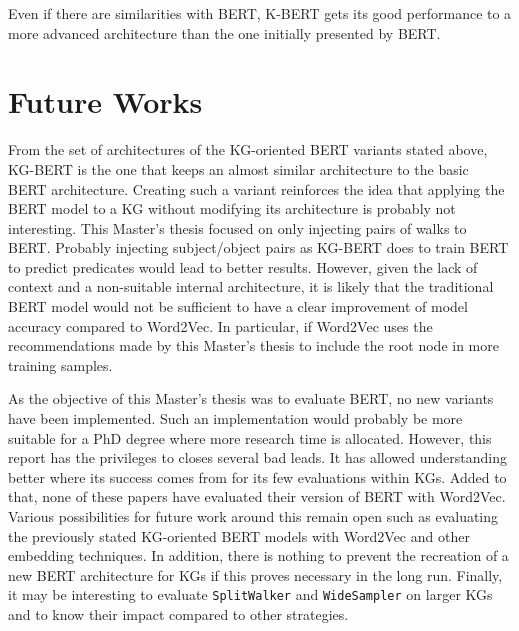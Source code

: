 \noindent Even if there are similarities with BERT, K-BERT gets its good
performance to a more advanced architecture than the one initially presented by
BERT.

\section{Future Works}
\label{sec:discussion:futur}

From the set of architectures of the KG-oriented BERT variants stated above,
KG-BERT is the one that keeps an almost similar architecture to the basic BERT
architecture. Creating such a variant reinforces the idea that
applying the BERT model to a KG without modifying its architecture is probably
not interesting. This Master's thesis focused on only injecting pairs of walks
to BERT. Probably injecting subject/object pairs as KG-BERT does to train BERT
to predict predicates would lead to better results. However, given the lack of
context and a non-suitable internal architecture, it is likely that the
traditional BERT model would not be sufficient to have a clear improvement of
model accuracy compared to Word2Vec. In particular, if Word2Vec uses the
recommendations made by this Master's thesis to include the root node in more
training samples.

As the objective of this Master's thesis was to evaluate BERT, no new variants
have been implemented. Such an implementation would probably be more suitable
for a PhD degree where more research time is allocated. However, this report has
the privileges to closes several bad leads. It has allowed understanding better
where its success comes from for its few evaluations within KGs. Added to that,
none of these papers have evaluated their version of BERT with Word2Vec. Various
possibilities for future work around this remain open such as evaluating the
previously stated KG-oriented BERT models with Word2Vec and other embedding
techniques. In addition, there is nothing to prevent the recreation of a new
BERT architecture for KGs if this proves necessary in the long run. Finally, it
may be interesting to evaluate \texttt{SplitWalker} and \texttt{WideSampler} on
larger KGs and to know their impact compared to other strategies.

